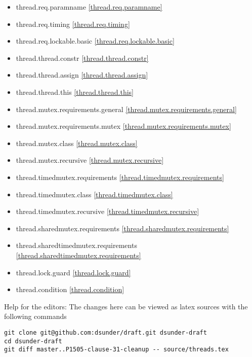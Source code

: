 \begin{multicols}{2}
\begin{itemize}
\item{thread.req.paramname                   \ref{thread.req.paramname}}
\item{thread.req.timing                      \ref{thread.req.timing}}
\item{thread.req.lockable.basic               \ref{thread.req.lockable.basic}}
\item{thread.thread.constr                    \ref{thread.thread.constr}}
\item{thread.thread.assign                    \ref{thread.thread.assign}}
\item{thread.thread.this                      \ref{thread.thread.this}}
\item{thread.mutex.requirements.general       \ref{thread.mutex.requirements.general}}
\item{thread.mutex.requirements.mutex         \ref{thread.mutex.requirements.mutex}}
\item{thread.mutex.class                      \ref{thread.mutex.class}}
\item{thread.mutex.recursive                  \ref{thread.mutex.recursive}}
\item{thread.timedmutex.requirements          \ref{thread.timedmutex.requirements}}
\item{thread.timedmutex.class                 \ref{thread.timedmutex.class}}
\item{thread.timedmutex.recursive             \ref{thread.timedmutex.recursive}}
\item{thread.sharedmutex.requirements         \ref{thread.sharedmutex.requirements}}
\item{thread.sharedtimedmutex.requirements    \ref{thread.sharedtimedmutex.requirements}}
\item{thread.lock.guard                       \ref{thread.lock.guard}}
\item{thread.condition                        \ref{thread.condition}}
\end{itemize}
\end{multicols}


\vfill
Help for the editors: The changes here can be viewed as latex sources with the following commands
\begin{verbatim}
git clone git@github.com:dsunder/draft.git dsunder-draft
cd dsunder-draft
git diff master..P1505-clause-31-cleanup -- source/threads.tex
\end{verbatim}
\newpage
